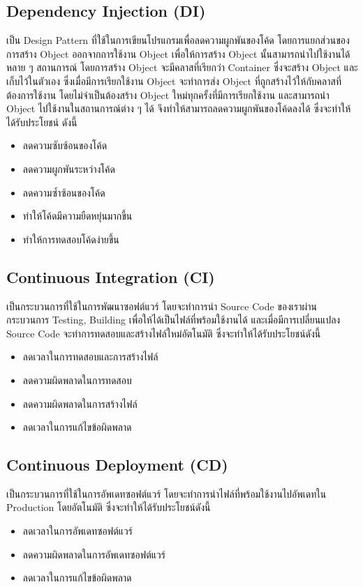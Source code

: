 \documentclass[12pt,oneside,openright,a4paper]{cpe-thai-project}
\begin{document}
  \subsection{Dependency Injection (DI)}
    \hspace{1cm}เป็น Design Pattern ที่ใช้ในการเขียนโปรแกรมเพื่อลดความผูกพันของโค้ด โดยการแยกส่วนของการสร้าง Object ออกจากการใช้งาน Object
    เพื่อให้การสร้าง Object นั้นสามารถนำไปใช้งานได้หลาย ๆ สถานการณ์ \cite{di} โดยการสร้าง Object จะมีคลาสที่เรียกว่า Container ซึ่งจะสร้าง Object และเก็บไว้ในตัวเอง
    ซึ่งเมื่อมีการเรียกใช้งาน Object จะทำการส่ง Object ที่ถูกสร้างไว้ให้กับคลาสที่ต้องการใช้งาน โดยไม่จำเป็นต้องสร้าง Object ใหม่ทุกครั้งที่มีการเรียกใช้งาน
    และสามารถนำ Object ไปใช้งานในสถานการณ์ต่าง ๆ ได้ จึงทำให้สามารถลดความผูกพันของโค้ดลงได้ ซึ่งจะทำให้ได้รับประโยชน์ ดังนี้
    \begin{itemize}
      \item ลดความซับซ้อนของโค้ด
      \item ลดความผูกพันระหว่างโค้ด
      \item ลดความซ้ำซ้อนของโค้ด
      \item ทำให้โค้ดมีความยืดหยุ่นมากขึ้น
      \item ทำให้การทดสอบโค้ดง่ายขึ้น
    \end{itemize}
  
  \subsection{Continuous Integration (CI)}
    \hspace{1cm}เป็นกระบวนการที่ใช้ในการพัฒนาซอฟต์แวร์ โดยจะทำการนำ Source Code ของเราผ่านกระบวนการ Testing, Building เพื่อให้ได้เป็นไฟล์ที่พร้อมใช้งานได้
    และเมื่อมีการเปลี่ยนแปลง Source Code จะทำการทดสอบและสร้างไฟล์ใหม่อัตโนมัติ \cite{ci} ซึ่งจะทำให้ได้รับประโยชน์ดังนี้
    \begin{itemize}
      \item ลดเวลาในการทดสอบและการสร้างไฟล์
      \item ลดความผิดพลาดในการทดสอบ
      \item ลดความผิดพลาดในการสร้างไฟล์
      \item ลดเวลาในการแก้ไขข้อผิดพลาด
    \end{itemize}

  \subsection{Continuous Deployment (CD)}
    \hspace{1cm}เป็นกระบวนการที่ใช้ในการอัพเดทซอฟต์แวร์ โดยจะทำการนำไฟล์ที่พร้อมใช้งานไปอัพเดทใน Production โดยอัตโนมัติ \cite{cd} ซึ่งจะทำให้ได้รับประโยชน์ดังนี้
    \begin{itemize}
      \item ลดเวลาในการอัพเดทซอฟต์แวร์
      \item ลดความผิดพลาดในการอัพเดทซอฟต์แวร์
      \item ลดเวลาในการแก้ไขข้อผิดพลาด
    \end{itemize}
\end{document}
